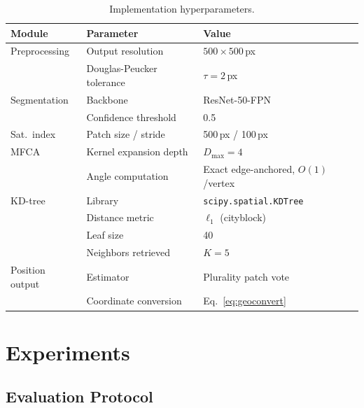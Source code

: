 \documentclass[10pt]{article}
\theoremstyle{plain}
\theoremstyle{definition}
\begin{document}
\begin{table}[htbp]
\caption{Implementation hyperparameters.}
\label{tab:impl}
\centering\small
\setlength{\tabcolsep}{4pt}
\begin{tabular}{lll}
\toprule
\textbf{Module} & \textbf{Parameter} & \textbf{Value} \\
\midrule
Preprocessing   & Output resolution            & $500\!\times\!500$\,px \\
                & Douglas-Peucker tolerance    & $\tau = 2$\,px \\
Segmentation    & Backbone                     & ResNet-50-FPN \\
                & Confidence threshold         & 0.5 \\
Sat.\ index     & Patch size / stride          & 500\,px / 100\,px \\
MFCA            & Kernel expansion depth       & $D_{\max} = 4$ \\
                & Angle computation            & Exact edge-anchored, $O(1)$/vertex \\
KD-tree         & Library                      & \texttt{scipy.spatial.KDTree} \\
                & Distance metric              & $\ell_1$ (cityblock) \\
                & Leaf size                    & 40 \\
                & Neighbors retrieved          & $K = 5$ \\
Position output & Estimator                    & Plurality patch vote \\
                & Coordinate conversion        & Eq.~\eqref{eq:geoconvert} \\
\bottomrule
\end{tabular}
\end{table}

\section{Experiments}
\label{sec:exp}

\subsection{Evaluation Protocol}
\label{sec:protocol}
\end{document}
